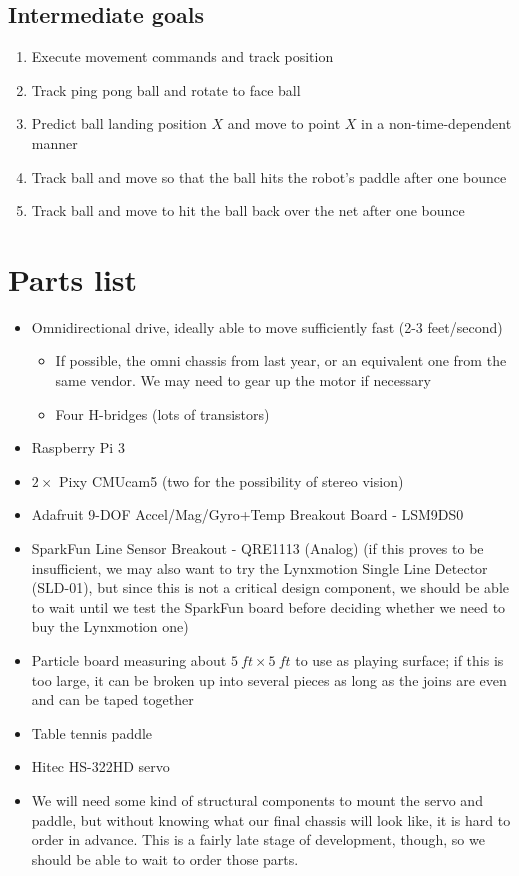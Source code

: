 \documentclass[letterpaper, 11pt]{article}
\begin{document}
\subsection*{Intermediate goals}
\begin{enumerate}
    \item Execute movement commands and track position
    \item Track ping pong ball and rotate to face ball
    \item Predict ball landing position $X$ and move to point $X$ in a non-time-dependent manner
    \item Track ball and move so that the ball hits the robot's paddle after one bounce
    \item Track ball and move to hit the ball back over the net after one bounce
\end{enumerate}

\section{Parts list}
\begin{itemize}
    \item Omnidirectional drive, ideally able to move sufficiently fast (2-3 feet/second)
        \begin{itemize}
            \item If possible, the omni chassis from last year, or an equivalent one from the same vendor. We may need to gear up the motor if necessary
            \item Four H-bridges (lots of transistors)
        \end{itemize}
    \item Raspberry Pi 3
    \item $2\times{}$ Pixy CMUcam5 (two for the possibility of stereo vision)
    \item Adafruit 9-DOF Accel/Mag/Gyro+Temp Breakout Board - LSM9DS0
    \item SparkFun Line Sensor Breakout - QRE1113 (Analog) (if this proves to be insufficient, we may also want to try the Lynxmotion Single Line Detector (SLD-01), but since this is not a critical design component, we should be able to wait until we test the SparkFun board before deciding whether we need to buy the Lynxmotion one)
    \item Particle board measuring about $\SI{5}{ft}\times\SI{5}{ft}$ to use as playing surface; if this is too large, it can be broken up into several pieces as long as the joins are even and can be taped together
    \item Table tennis paddle
    \item Hitec HS-322HD servo
    \item We will need some kind of structural components to mount the servo and paddle, but without knowing what our final chassis will look like, it is hard to order in advance. This is a fairly late stage of development, though, so we should be able to wait to order those parts.
\end{itemize}
\end{document}
